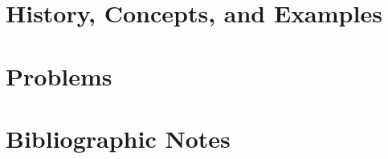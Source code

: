 \label{imperative:defining}
\section{History, Concepts, and Examples}

\section{Problems}

\section{Bibliographic Notes}\label{imperative:defining:notes}